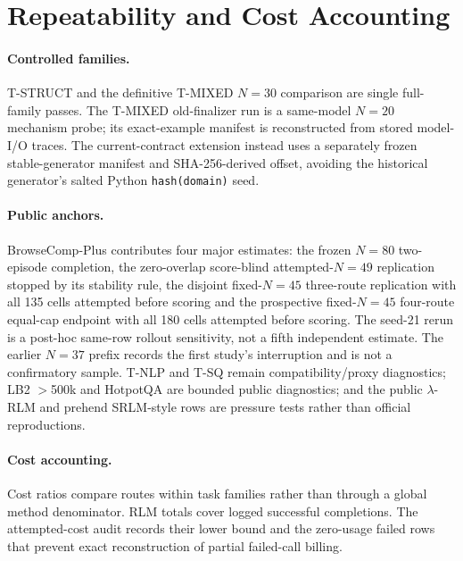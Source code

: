 \FloatBarrier


\section{Repeatability and Cost Accounting}
\label{app:reproducibility}

\paragraph{Controlled families.}
T-STRUCT and the definitive T-MIXED $N=30$ comparison are single full-family passes. The T-MIXED old-finalizer run is a same-model $N=20$ mechanism probe; its exact-example manifest is reconstructed from stored model-I/O traces. The current-contract extension instead uses a separately frozen stable-generator manifest and SHA-256-derived offset, avoiding the historical generator's salted Python \texttt{hash(domain)} seed.

\paragraph{Public anchors.}
BrowseComp-Plus contributes four major estimates: the frozen $N=80$ two-episode completion, the zero-overlap score-blind attempted-$N=49$ replication stopped by its stability rule, the disjoint fixed-$N=45$ three-route replication with all 135 cells attempted before scoring and the prospective fixed-$N=45$ four-route equal-cap endpoint with all 180 cells attempted before scoring. The seed-21 rerun is a post-hoc same-row rollout sensitivity, not a fifth independent estimate. The earlier $N=37$ prefix records the first study's interruption and is not a confirmatory sample. T-NLP and T-SQ remain compatibility/proxy diagnostics; LB2 $>$500k and HotpotQA are bounded public diagnostics; and the public $\lambda$-RLM and prehend SRLM-style rows are pressure tests rather than official reproductions.

\paragraph{Cost accounting.}
Cost ratios compare routes within task families rather than through a global method denominator. RLM totals cover logged successful completions. The attempted-cost audit records their lower bound and the zero-usage failed rows that prevent exact reconstruction of partial failed-call billing.

